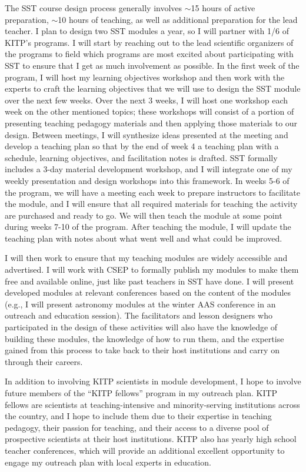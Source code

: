 \documentclass[11pt]{amsart} %
\theoremstyle{definition}
\numberwithin{equation}{section}
\begin{document}
The SST course design process generally involves $\sim$15 hours of active preparation, $\sim$10 hours of teaching, as well as additional preparation for the lead teacher.
I plan to design two SST modules a year, so I will partner with 1/6 of KITP's programs.
I will start by reaching out to the lead scientific organizers of the programs to field which programs are most excited about participating with SST to ensure that I get as much involvement as possible.
In the first week of the program, I will host my learning objectives workshop and then work with the experts to craft the learning objectives that we will use to design the SST module over the next few weeks.
Over the next 3 weeks, I will host one workshop each week on the other mentioned topics; these workshops will consist of a portion of presenting teaching pedagogy materials and then applying those materials to our design.
Between meetings, I will synthesize ideas presented at the meeting and develop a teaching plan so that by the end of week 4 a teaching plan with a schedule, learning objectives, and facilitation notes is drafted.
SST formally includes a 3-day material development workshop, and I will integrate one of my weekly presentation and design workshops into this framework.
In weeks 5-6 of the program, we will have a meeting each week to prepare instructors to facilitate the module, and I will ensure that all required materials for teaching the activity are purchased and ready to go.
We will then teach the module at some point during weeks 7-10 of the program.
After teaching the module, I will update the teaching plan with notes about what went well and what could be improved.


I will then work to ensure that my teaching modules are widely accessible and advertised.
I will work with CSEP to formally publish my modules to make them free and available online, just like past teachers in SST have done.
I will present developed modules at relevant conferences based on the content of the modules (e.g., I will present astronomy modules at the winter AAS conference in an outreach and education session).
The facilitators and lesson designers who participated in the design of these activities will also have the knowledge of building these modules, the knowledge of how to run them, and the expertise gained from this process to take back to their host institutions and carry on through their careers.

In addition to involving KITP scientists in module development, I hope to involve future members of the ``KITP fellows'' program in my outreach plan.
KITP fellows are scientists at teaching-intensive and minority-serving institutions across the country, and I hope to include them due to their expertise in teaching pedagogy, their passion for teaching, and their access to a diverse pool of prospective scientists at their host institutions.
KITP also has yearly high school teacher conferences, which will provide an additional excellent opportunity to engage my outreach plan with local experts in education.
\end{document}
